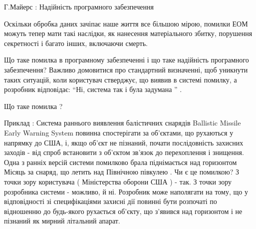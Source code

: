Г.Майерс : Надійність програмного забезпечення

Оскільки обробка даних зачіпає наше життя все більшою мірою, помилки ЕОМ можуть тепер мати такі наслідки, як нанесення матеріального збитку, порушення секретності і багато інших, включаючи смерть.

Що таке помилка в програмному забезпеченні і що таке надійність програмного забезпечення? Важливо домовитися про стандартний визначенні, щоб уникнути таких ситуацій, коли користувач стверджує, що виявив в системі помилку, а розробник відповідає: ``Ні, система так і була задумана '' .

Що таке помилка ?

Приклад : Система раннього виявлення балістичних снарядів Ballistic Missile Early Warning System повинна спостерігати за об'єктами, що рухаються у напрямку до США, і, якщо об'єкт не пізнаний, почати послідовність захисних заходів - від спроб встановити з об'єктом зв'язок до перехоплення і знищення. Одна з ранніх версій системи помилково брала піднімається над горизонтом Місяць за снаряд, що летить над Північною півкулею . Чи є це помилкою? З точки зору користувача ( Міністерства оборони США ) - так. З точки зору розробника системи - можливо, й ні. Розробник може наполягати на тому, що у відповідності зі специфікаціями захисні дії повинні бути розпочаті по відношенню до будь-якого рухається об'єкту, що з'явився над горизонтом і не пізнаний як мирний літальний апарат.

